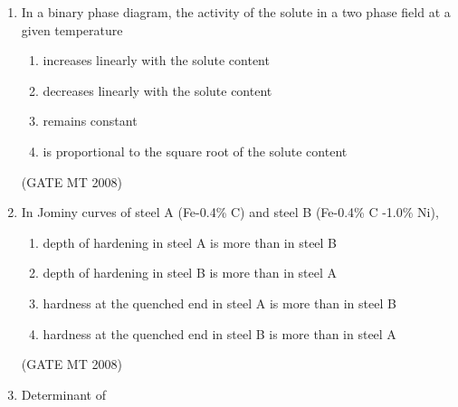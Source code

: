 \documentclass[11pt, letterpaper]{article}
\theoremstyle{remark}
\begin{document}
\begin{enumerate}
\hfill(GATE MT 2008)


\begin{multicols}{4}
\begin{enumerate}
\item P, Q
\item P, R 
\item R, S
\item Q, R
\end{enumerate}
\end{multicols}

\hfill(GATE MT 2008)

\item In a binary phase diagram, the activity of the solute in a two phase field at a given temperature

\begin{multicols}{1}
\begin{enumerate}
\item increases linearly with the solute content
\item decreases linearly with the solute content
\item remains constant
\item is proportional to the square root of the solute content
\end{enumerate}
\end{multicols}

\hfill(GATE MT 2008)

\item In Jominy curves of steel A (Fe-0.4\% C) and steel B (Fe-0.4\% C -1.0\% Ni),

\begin{multicols}{1}
\begin{enumerate}
\item depth of hardening in steel A is more than in steel B 
\item depth of hardening in steel B is more than in steel A
\item hardness at the quenched end in steel A is more than in steel B
\item hardness at the quenched end in steel B is more than in steel A
\end{enumerate}
\end{multicols}

\hfill(GATE MT 2008)

\item Determinant of 


\end{enumerate}
\end{document}
